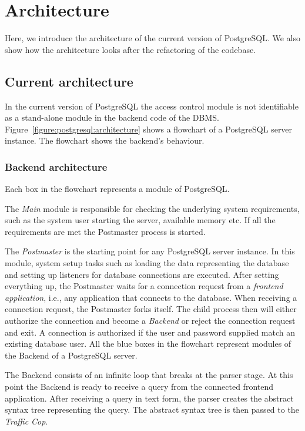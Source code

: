 \section{Architecture}


Here, we introduce the architecture of the current version of PostgreSQL.
%
We also show how the architecture looks after the refactoring of the codebase.

\subsection{Current architecture}
%
In the current version of PostgreSQL the access control module is not identifiable as a stand-alone module in the backend code of the DBMS.
%
Figure~\ref{figure:postgresql:architecture} shows a flowchart of a PostgreSQL server instance.
%
The flowchart shows the backend's behaviour.
%
\subsubsection{Backend architecture}
%
Each box in the flowchart represents a module of PostgreSQL.

The \emph{Main} module is responsible for checking the underlying system requirements, such as the system user starting the server, available memory etc. If all the requirements are met the {Postmaster} process is started.

The \emph{Postmaster} is the starting point for any PostgreSQL server instance. 
%
In this module, system setup tasks such as loading the data representing the database and setting up listeners for database connections are executed.
%
After setting everything up, the Postmaster waits for a connection request from a \emph{frontend application}, i.e., any application that connects to the database.
%
When receiving a connection request, the Postmaster forks itself.
%
The child process then will either authorize the connection and become a \emph{Backend} or reject the connection request and exit.
%
A connection is authorized if the user and password supplied match an existing database user.
%
All the blue boxes in the flowchart represent modules of the Backend of a PostgreSQL server.

The Backend consists of an infinite loop that breaks at the parser stage.
%
At this point the Backend is ready to receive a query from the connected frontend application.
%
After receiving a query in text form, the parser creates the abstract syntax tree representing the query.
%
The abstract syntax tree is then passed to the \emph{Traffic Cop}.


